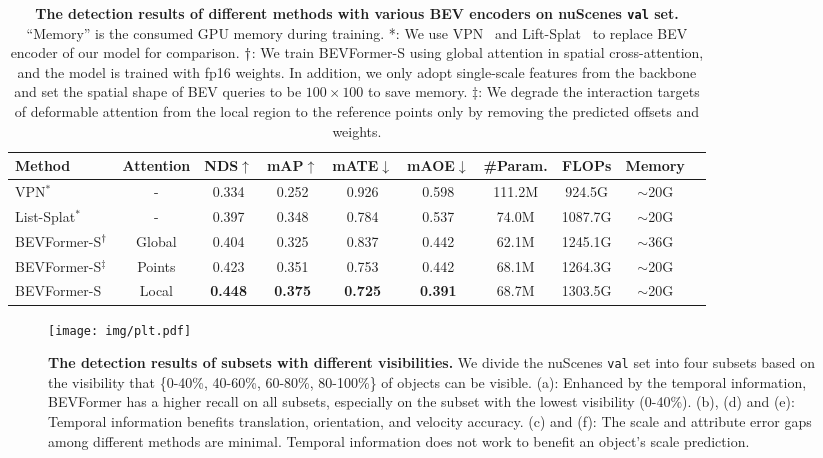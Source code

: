 \documentclass{article}
\begin{document}
\begin{table}[t] 
\begin{center}
\caption{\textbf{The detection results of different methods with various BEV encoders on nuScenes \texttt{val} set.} ``Memory'' is the consumed GPU memory during training.
*: We use VPN~\cite{pan2020cross} and Lift-Splat~\cite{philion2020lift} to replace BEV encoder of our model for comparison. ${\text{\textdagger}}$: We train BEVFormer-S using global attention in spatial cross-attention, and the model is trained with fp16 weights. In addition, we only adopt single-scale features from the backbone and set the spatial shape of BEV queries to be $100\!\times\!100$ to save memory.
$\ddag$: We degrade the interaction targets of deformable attention from the local region to the reference points only by removing the predicted offsets and weights.
}

\setlength{\tabcolsep}{1.4mm}
\begin{tabular}{l  c |c c c c |c c c  c }
\toprule
Method &  Attention & NDS$\uparrow$  & mAP$\uparrow$  & mATE$\downarrow$    & mAOE$\downarrow$       & \#Param. &FLOPs& Memory \\
\midrule


VPN$^*$~\cite{pan2020cross}&- & 0.334 &0.252 &0.926 &0.598 & 111.2M &924.5G &$\sim\!$20G\\
List-Splat$^*$~\cite{philion2020lift}&- &  0.397 & 0.348 &0.784 &0.537 &74.0M & 1087.7G&$\sim\!$20G \\

\midrule
\rowcolor{gray95}
BEVFormer-S$^{\text{\textdagger}}$ &Global & 0.404 & 0.325 & 0.837 &0.442&62.1M & 1245.1G& $\sim\!$36G\\ \rowcolor{gray9}
BEVFormer-S$^\ddag$& Points &0.423 &0.351 &0.753&0.442  & 68.1M & 1264.3G&$\sim\!$20G\\
\rowcolor{gray85}
BEVFormer-S& Local &\textbf{0.448} &\textbf{0.375}&\textbf{0.725} &\textbf{0.391} & 68.7M &1303.5G &$\sim\!$20G\\
\bottomrule
\end{tabular} \label{bevformer_s_abl}
\end{center}


\end{table}

\begin{figure}[t]
\centering
\texttt{[image: img/plt.pdf]}
\caption{\textbf{The detection results of subsets with different visibilities.} We divide the nuScenes \texttt{val} set into four subsets based on the visibility that \{0-40\%, 40-60\%, 60-80\%, 80-100\%\} of objects can be visible. (a): Enhanced by the temporal information, BEVFormer has a higher recall on all subsets, especially on the subset with the lowest visibility (0-40\%). (b), (d) and (e): Temporal information benefits translation, orientation, and velocity accuracy. (c) and (f): The scale and attribute error gaps among different methods are minimal. Temporal information does not work to benefit an object's scale prediction.}
\label{fig:plt}

\end{figure}
\end{document}
